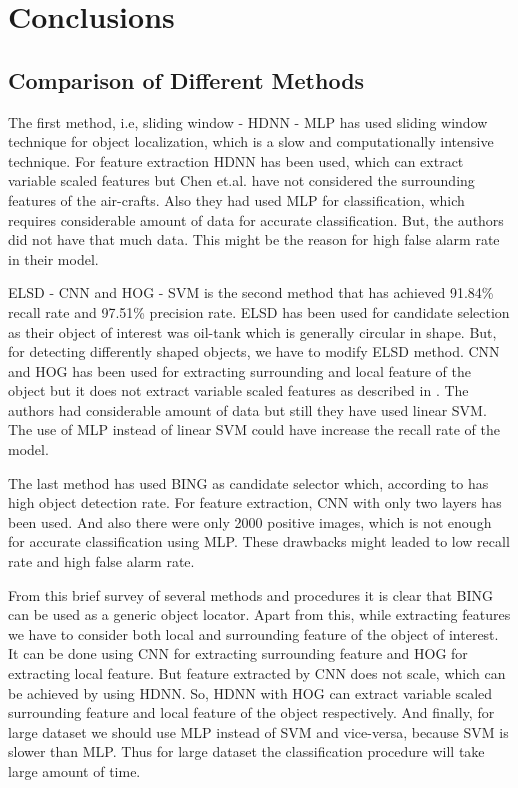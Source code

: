 \chapter{Conclusions}
\section{Comparison of Different Methods}
The first method, i.e, sliding window - HDNN - MLP has used sliding window technique for object localization,  which is a slow and computationally intensive technique. For feature extraction HDNN has been used, which can extract variable scaled features but Chen et.al.\cite{b8} have not considered the surrounding features of the air-crafts. Also they had used MLP for classification, which requires considerable amount of data for accurate classification. But, the authors did not have that much data. This might be the reason for high false alarm rate in their model.

\par ELSD - CNN and HOG - SVM is the second method that has achieved 91.84\% recall rate and 97.51\% precision rate. ELSD has been used for candidate selection as their object of interest was oil-tank which is generally circular in shape. But, for detecting differently shaped objects, we have to modify ELSD method. CNN and HOG has been used for extracting surrounding and local feature of the object but it does not extract variable scaled features as described in \cite{b8}. The authors had considerable amount of data but still they have used linear SVM. The use of MLP instead of linear SVM could have increase the recall rate of the model.

\par The last method has used BING as candidate selector which, according to \cite{b2} has high object detection rate. For feature extraction, CNN with only two layers has been used. And also there were only 2000 positive images, which is not enough for accurate classification using MLP. These drawbacks might leaded to low recall rate and high false alarm rate.

\par From this brief survey of several methods and procedures it is clear that BING can be used as a generic object locator. Apart from this, while extracting features we have to consider both local and surrounding feature of the object of interest. It can be done using CNN for extracting surrounding feature and HOG for extracting local feature. But feature extracted by CNN does not scale, which can be achieved by using HDNN. So, HDNN with HOG can extract variable scaled surrounding feature and local feature of the object respectively. And finally, for large dataset we should use MLP instead of SVM and vice-versa, because SVM is slower than MLP. Thus for large dataset the classification procedure will take large amount of time.

